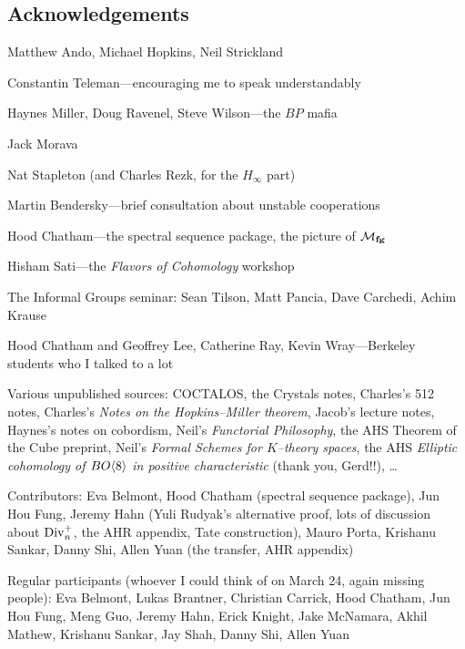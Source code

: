


\newpage

\subsection*{Acknowledgements}

Matthew Ando, Michael Hopkins, Neil Strickland

Constantin Teleman---encouraging me to speak understandably

Haynes Miller, Doug Ravenel, Steve Wilson---the $BP$ mafia

Jack Morava

Nat Stapleton (and Charles Rezk, for the $H_\infty$ part)

Martin Bendersky---brief consultation about unstable cooperations

Hood Chatham---the spectral sequence package, the picture of $\mathcal{M}_{\mathbf{fg}}$

Hisham Sati---the \textit{Flavors of Cohomology} workshop

The Informal Groups seminar: Sean Tilson, Matt Pancia, Dave Carchedi, Achim Krause

Hood Chatham and Geoffrey Lee, Catherine Ray, Kevin Wray---Berkeley students who I talked to a lot

Various unpublished sources: COCTALOS, the Crystals notes, Charles's 512 notes, Charles's \textit{Notes on the Hopkins--Miller theorem}, Jacob's lecture notes, Haynes's notes on cobordism, Neil's \textit{Functorial Philosophy}, the AHS Theorem of the Cube preprint, Neil's \textit{Formal Schemes for $K$--theory spaces}, the AHS \textit{Elliptic cohomology of $BO\langle8\rangle$ in positive characteristic} (thank you, Gerd!!), \ldots





Contributors: Eva Belmont, Hood Chatham (spectral sequence package), Jun Hou Fung, Jeremy Hahn (Yuli Rudyak's alternative proof, lots of discussion about $\operatorname{Div}_n^+$, the AHR appendix, Tate construction), Mauro Porta, Krishanu Sankar, Danny Shi, Allen Yuan (the transfer, AHR appendix)

Regular participants (whoever I could think of on March 24, again missing people): Eva Belmont, Lukas Brantner, Christian Carrick, Hood Chatham, Jun Hou Fung, Meng Guo, Jeremy Hahn, Erick Knight, Jake McNamara, Akhil Mathew, Krishanu Sankar, Jay Shah, Danny Shi, Allen Yuan

